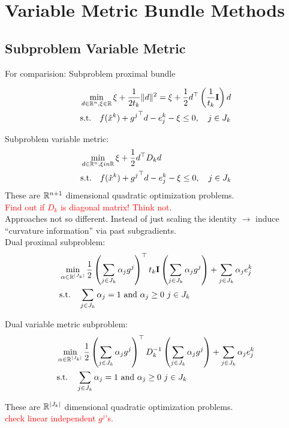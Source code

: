 \section{Variable Metric Bundle Methods}

\subsection{Subproblem Variable Metric}

For comparision: Subproblem proximal bundle

\begin{align}
	&\min_{d \in \mathbb{R}^n, \xi \in \mathbb{R}} \xi + \frac{1}{2t_k}\|d\|^2 = \xi + \frac{1}{2}d^{\top}\left(\frac{1}{t_k}\mathbf{I}\right)d \\
	&\text{s.t.} \quad f(\hat{x}^k)+{g^j}^{\top}d - e^k_j - \xi \leq 0, \quad j \in J_k
\end{align}

Subproblem variable metric:
\begin{align}
	&\min_{d \in \mathbb{R}^n, \xi in \mathbb{R}} \xi + \frac{1}{2}d^{\top}D_kd \\
	&\text{s.t.} \quad f(\hat{x}^k)+{g^j}^{\top}d - e^k_j - \xi \leq 0, \quad j \in J_k
\end{align}
These are \(\mathbb{R}^{n+1}\) dimensional quadratic optimization problems.\\

\textcolor{red}{Find out if \(D_k\) is diagonal matrix! Think not.} \\

Approaches not so different. Instead of just scaling the identity \(\rightarrow\) induce ``curvature information'' via past subgradients. \\

Dual proximal subproblem:
\begin{align}
	&\min_{\alpha \in \mathbb{R}^{|J_k|}} \frac{1}{2} \left(\sum_{j \in J_k}{\alpha_jg^j}\right)^{\top} t_k\mathbf{I} \left(\sum_{j \in J_k}{\alpha_jg^j}\right) + \sum_{j \in J_k}{\alpha_j e_j^k} \\
		&\text{s.t.} \quad \sum_{j \in J_k}{\alpha_j} = 1 \text{ and } \alpha_j \geq 0 ~ j \in J_k
\end{align}


Dual variable metric subproblem:
\begin{align}
	&\min_{\alpha \in \mathbb{R}^{|J_k|}} \frac{1}{2} \left(\sum_{j \in J_k}{\alpha_jg^j}\right)^{\top} D^{-1}_k \left(\sum_{j \in J_k}{\alpha_jg^j}\right) + \sum_{j \in J_k}{\alpha_j e_j^k} \\
		&\text{s.t.} \quad \sum_{j \in J_k}{\alpha_j} = 1 \text{ and } \alpha_j \geq 0 ~ j \in J_k
\end{align}

These are \(\mathbb{R}^{|J_k|}\) dimensional quadratic optimization problems. \\

\textcolor{red}{check linear independent \(g^j\)'s.}
